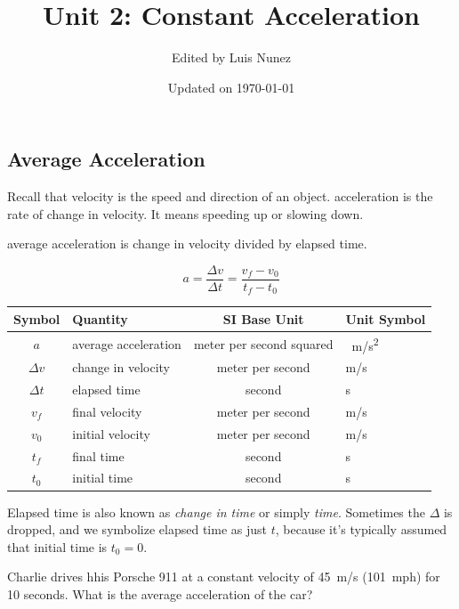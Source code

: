 \documentclass{article}
\title{Unit 2: Constant Acceleration}
\author{Edited by Luis Nunez}
\date{Updated on \today}
\numberwithin{equation}{section}
\numberwithin{figure}{section}
\begin{document}
\maketitle

\subsection{Average Acceleration}

Recall that velocity is the speed and direction of an object. \Gls{acceleration} is the rate of change in velocity. It means speeding up or slowing down. 

\begin{mdframed}[backgroundcolor=black!10]
\Gls{average acceleration} is change in velocity divided by elapsed time.

\begin{equation}
    a = \frac{\Delta{v}}{\Delta{t}} = \frac{v_f - v_0}{t_f - t_0}
\end{equation}

\begin{center}
    \begin{tabular}{cl|cl}
    \hline
    \textbf{Symbol} & \textbf{Quantity} & \textbf{SI Base Unit} & \textbf{Unit Symbol}  \\
    \hline\hline
    \rule{0pt}{2.5ex}
        $a$ & average acceleration & meter per second squared & \SI{}{\meter/\second^2}\\
        $\Delta{v}$ & change in velocity & meter per second & m/s\\
        $\Delta{t}$ & elapsed time & second & s \\
    \hline
        $v_f$ & final velocity & meter per second & m/s\\
        $v_0$ & initial velocity & meter per second & m/s\\
        $t_f$ & final time & second & s \\    
        $t_0$ & initial time & second & s \\
        \hline
    \end{tabular}
\end{center}

Elapsed time is also known as \textit{change in time} or simply \textit{time}. Sometimes the $\Delta$ is dropped, and we symbolize elapsed time as just $t$, because it's typically assumed that initial time is $t_0 = 0$.
\end{mdframed}

\begin{example} \label{DcGEnk}
    Charlie drives hhis Porsche 911 at a constant velocity of \SI{45}{m/s} (\SI{101}{mph}) for 10 seconds. What is the average acceleration of the car?
\end{example}
\end{document}
